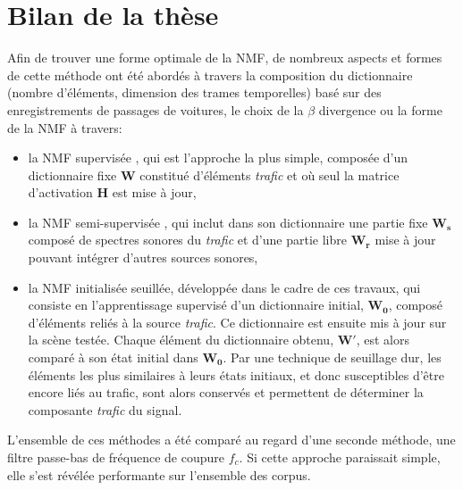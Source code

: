 \section*{Bilan de la thèse}
Afin de trouver une forme optimale de la NMF, de nombreux aspects et formes de cette méthode ont été abordés  à travers la composition du dictionnaire (nombre d'éléments, dimension des trames temporelles) basé sur des enregistrements de passages de voitures, le choix de la $\beta$ divergence ou la forme de la NMF à travers: 
\begin{itemize}
\item la NMF supervisée \cite{lee_learning_1999,fevotte_algorithms_2011}, qui est l'approche la plus simple, composée d'un dictionnaire fixe $ \mathbf{W}$ constitué d'éléments \textit{trafic} et où seul la matrice d'activation $\mathbf{H}$ est mise à jour, 
\item la NMF semi-supervisée \cite{lee_semi-supervised_2010,kitamura2014music}, qui inclut dans son  dictionnaire une partie fixe $\mathbf{W_s}$ composé de spectres sonores du \textit{trafic} et d'une partie libre $\mathbf{W_r}$ mise à jour pouvant intégrer d'autres sources sonores,
\item la NMF initialisée seuillée, développée dans le cadre de ces travaux, qui consiste en l'apprentissage supervisé d'un dictionnaire initial, $\mathbf{W_0}$, composé d'éléments reliés à la source \textit{trafic}. Ce dictionnaire est ensuite mis à jour sur la scène testée. Chaque élément du dictionnaire obtenu, $\mathbf{W'}$, est alors comparé à son état initial dans $\mathbf{W_0}$. Par une technique de seuillage dur, les éléments les plus similaires à leurs états initiaux, et donc susceptibles d'être encore liés au trafic, sont alors conservés et permettent de déterminer la composante \textit{trafic} du signal. 
\end{itemize} 

L'ensemble de ces méthodes a été comparé au regard d'une seconde méthode, une filtre passe-bas de fréquence de coupure $f_c$. Si cette approche paraissait simple, elle s'est révélée performante sur l'ensemble des corpus.\\

